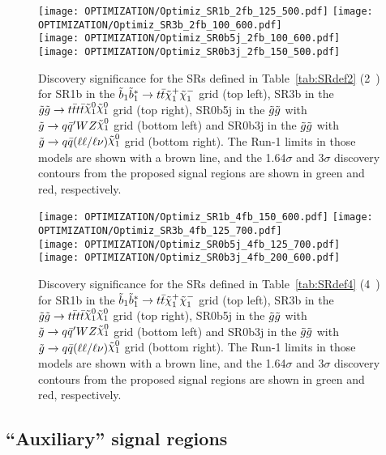 \begin{figure}[!htb]
\centering
  \texttt{[image: OPTIMIZATION/Optimiz\_SR1b\_2fb\_125\_500.pdf]}
  \texttt{[image: OPTIMIZATION/Optimiz\_SR3b\_2fb\_100\_600.pdf]}\\
  \texttt{[image: OPTIMIZATION/Optimiz\_SR0b5j\_2fb\_100\_600.pdf]}
  \texttt{[image: OPTIMIZATION/Optimiz\_SR0b3j\_2fb\_150\_500.pdf]}
  \caption{Discovery significance for the SRs defined in Table~\ref{tab:SRdef2} (2~\ifb) for SR1b in the $\tilde{b}_{1}\tilde{b}_{1}^*\to t\bar t\tilde\chi_1^+\tilde\chi_1^-$ grid (top left), SR3b in the $\gluino\gluino\to t\bar tt\bar t\ninoone\ninoone$ grid (top right), SR0b5j in the $\tilde{g}\tilde{g}$ with $\gluino\to q\bar{q}'WZ\ninoone$ grid (bottom left) and SR0b3j in the $\tilde{g}\tilde{g}$ with $\gluino\to q\bar{q}(\ell\ell/\ell\nu)\ninoone$ grid (bottom right). The Run-1 limits in those models are shown with a brown line, and the 1.64$\sigma$ and 3$\sigma$ discovery contours from the proposed signal regions are shown in green and red, respectively.}
\label{fig:OptimSig2}
\end{figure}


\begin{figure}[!htb]
\centering
  \texttt{[image: OPTIMIZATION/Optimiz\_SR1b\_4fb\_150\_600.pdf]}
  \texttt{[image: OPTIMIZATION/Optimiz\_SR3b\_4fb\_125\_700.pdf]}\\
  \texttt{[image: OPTIMIZATION/Optimiz\_SR0b5j\_4fb\_125\_700.pdf]}
  \texttt{[image: OPTIMIZATION/Optimiz\_SR0b3j\_4fb\_200\_600.pdf]}
  \caption{Discovery significance for the SRs defined in Table~\ref{tab:SRdef4} (4~\ifb) for SR1b in the $\tilde{b}_{1}\tilde{b}_{1}^*\to t\bar t\tilde\chi_1^+\tilde\chi_1^-$ grid (top left), SR3b in the $\gluino\gluino\to t\bar tt\bar t\ninoone\ninoone$ grid (top right), SR0b5j in the $\tilde{g}\tilde{g}$ with $\gluino\to q\bar{q}'WZ\ninoone$ grid (bottom left) and SR0b3j in the $\tilde{g}\tilde{g}$ with $\gluino\to q\bar{q}(\ell\ell/\ell\nu)\ninoone$ grid (bottom right). The Run-1 limits in those models are shown with a brown line, and the 1.64$\sigma$ and 3$\sigma$ discovery contours from the proposed signal regions are shown in green and red, respectively.}
\label{fig:OptimSig4}
\end{figure}


\subsection{``Auxiliary'' signal regions}
 
